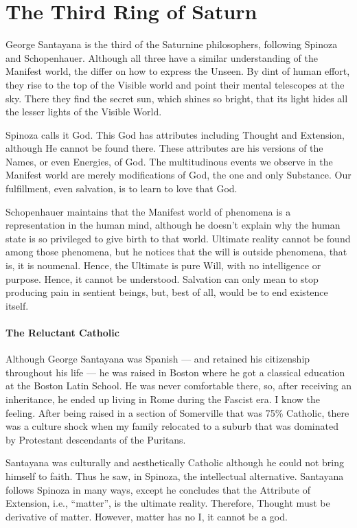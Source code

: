 \section{The Third Ring of Saturn}

George Santayana is the third of the Saturnine philosophers, following Spinoza and Schopenhauer. Although all three have a similar understanding of the Manifest world, the differ on how to express the Unseen. By dint of human effort, they rise to the top of the Visible world and point their mental telescopes at the sky. There they find the secret sun, which shines so bright, that its light hides all the lesser lights of the Visible World.

Spinoza calls it God. This God has attributes including Thought and Extension, although He cannot be found there. These attributes are his versions of the Names, or even Energies, of God. The multitudinous events we observe in the Manifest world are merely modifications of God, the one and only Substance. Our fulfillment, even salvation, is to learn to love that God.

Schopenhauer maintains that the Manifest world of phenomena is a representation in the human mind, although he doesn't explain why the human state is so privileged to give birth to that world. Ultimate reality cannot be found among those phenomena, but he notices that the will is outside phenomena, that is, it is noumenal. Hence, the Ultimate is pure Will, with no intelligence or purpose. Hence, it cannot be understood. Salvation can only mean to stop producing pain in sentient beings, but, best of all, would be to end existence itself.

\paragraph{The Reluctant Catholic}


Although George Santayana was Spanish --- and retained his citizenship throughout his life --- he was raised in Boston where he got a classical education at the Boston Latin School. He was never comfortable there, so, after receiving an inheritance, he ended up living in Rome during the Fascist era. I know the feeling. After being raised in a section of Somerville that was 75\% Catholic, there was a culture shock when my family relocated to a suburb that was dominated by Protestant descendants of the Puritans.

Santayana was culturally and aesthetically Catholic although he could not bring himself to faith. Thus he saw, in Spinoza, the intellectual alternative. Santayana follows Spinoza in many ways, except he concludes that the Attribute of Extension, i.e., ``matter'', is the ultimate reality. Therefore, Thought must be derivative of matter. However, matter has no I, it cannot be a god.


